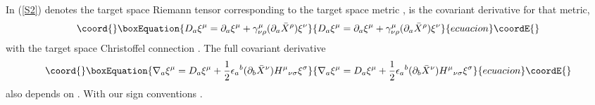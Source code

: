 \documentclass[a4paper,12pt]{article}
\begin{document}
In (\ref{S2}) \coordHE{} denotes the target space Riemann tensor 
corresponding 
to the target space metric \coordHE{}, \coordHE{} is the covariant
derivative for that metric, 
\begin{equation}\coord{}\boxEquation{
D_a\xi^\mu =\partial_a\xi^\mu +\gamma_{\nu\rho}^\mu 
(\partial_a \bar X^\rho )\xi^\nu \label{covder}
}{
D_a\xi^\mu =\partial_a\xi^\mu +\gamma_{\nu\rho}^\mu 
(\partial_a \bar X^\rho )\xi^\nu }{ecuacion}\coordE{}\end{equation}
with the target space Christoffel connection \myHighlight{$\gamma$}\coordHE{}. The full covariant
derivative
\begin{equation}\coord{}\boxEquation{
\nabla_a\xi^\mu =D_a \xi^\mu +\frac 12 {\epsilon_a}^b
(\partial_b \bar X^\nu ){H^\mu}_{\nu\sigma} \xi^\sigma
\label{nabla}
}{
\nabla_a\xi^\mu =D_a \xi^\mu +\frac 12 {\epsilon_a}^b
(\partial_b \bar X^\nu ){H^\mu}_{\nu\sigma} \xi^\sigma
}{ecuacion}\coordE{}\end{equation}
also depends on
\coordHE{}. 
With our sign conventions \coordHE{}. 
\end{document}
